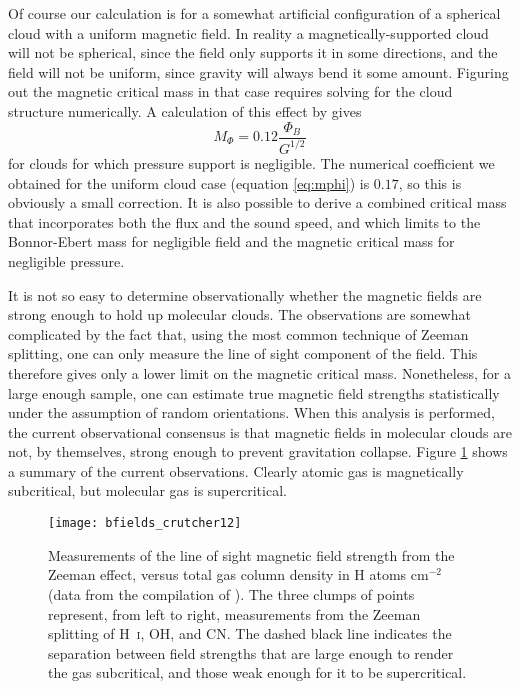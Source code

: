 Of course our calculation is for a somewhat artificial configuration of a spherical cloud with a uniform magnetic field. In reality a magnetically-supported cloud will not be spherical, since the field only supports it in some directions, and the field will not be uniform, since gravity will always bend it some amount. Figuring out the magnetic critical mass in that case requires solving for the cloud structure numerically. A calculation of this effect by \citet{tomisaka98a} gives
\begin{equation}
M_{\Phi} = 0.12\frac{\Phi_B}{G^{1/2}}
\end{equation}
for clouds for which pressure support is negligible. The numerical coefficient we obtained for the uniform cloud case (equation \ref{eq:mphi}) is $0.17$, so this is obviously a small correction. It is also possible to derive a combined critical mass that incorporates both the flux and the sound speed, and which limits to the Bonnor-Ebert mass for negligible field and the magnetic critical mass for negligible pressure.

It is not so easy to determine observationally whether the magnetic fields are strong enough to hold up molecular clouds.  The observations are somewhat complicated by the fact that, using the most common technique of Zeeman splitting, one can only measure the line of sight component of the field. This therefore gives only a lower limit on the magnetic critical mass. Nonetheless, for a large enough sample, one can estimate true magnetic field strengths statistically under the assumption of random orientations. When this analysis is performed, the current observational consensus is that magnetic fields in molecular clouds are not, by themselves, strong enough to prevent gravitation collapse. Figure \ref{fig:bfields} shows a summary of the current observations. Clearly atomic gas is magnetically subcritical, but molecular gas is supercritical.

\begin{figure}
\texttt{[image: bfields\_crutcher12]}
\caption[Magnetic field strength measurements]{
\label{fig:bfields}
Measurements of the line of sight magnetic field strength from the Zeeman effect, versus total gas column density in H atoms cm$^{-2}$ (data from the compilation of \citealt{crutcher12a}). The three clumps of points represent, from left to right, measurements from the Zeeman splitting of H~\textsc{i}, OH, and CN. The dashed black line indicates the separation between field strengths that are large enough to render the gas subcritical, and those weak enough for it to be supercritical.
}
\end{figure}

